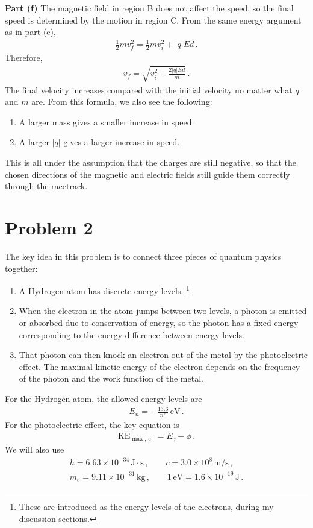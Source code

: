 \documentclass[11pt]{article}
\begin{document}
\noindent\textbf{Part (f)} The magnetic field in region B does not affect the speed, so the final speed is determined by the motion in region C. From the same energy argument as in part (e),
\begin{align*}
\frac{1}{2}mv_f^2 = \frac{1}{2}mv_i^2 + |q|Ed\,.
\end{align*}
Therefore,
\begin{align*}
v_f = \sqrt{v_i^2 + \frac{2|q|Ed}{m}}\,.
\end{align*}
The final velocity increases compared with the initial velocity no matter what $q$ and $m$ are. From this formula, we also see the following:
\begin{enumerate}
\item A larger mass gives a smaller increase in speed.
\item A larger $|q|$ gives a larger increase in speed.
\end{enumerate}
This is all under the assumption that the charges are still negative, so that the chosen directions of the magnetic and electric fields still guide them correctly through the racetrack.\\

\section*{Problem 2}
The key idea in this problem is to connect three pieces of quantum physics together:
\begin{enumerate}
\item A Hydrogen atom has discrete energy levels. \footnote{These are introduced as the energy levels of the electrons, during my discussion sections. }
\item When the electron in the atom jumps between two levels, a photon is emitted or absorbed due to conservation of energy, so the photon has a fixed energy corresponding to the energy difference between energy levels. 
\item That photon can then knock an electron out of the metal by the photoelectric effect. The maximal kinetic energy of the electron depends on the frequency of the photon and the work function of the metal. 
\end{enumerate}
For the Hydrogen atom, the allowed energy levels are
\begin{align*}
E_n = -\frac{13.6}{n^2}\,\text{eV}\,.
\end{align*}
For the photoelectric effect, the key equation is
\begin{align*}
\text{KE}_{\max,\,e^-} = E_{\gamma} - \phi\,.
\end{align*}
We will also use
\begin{align*}
h = 6.63\times 10^{-34}\,\text{J}\cdot\text{s}\,,\qquad
c = 3.0\times 10^8\,\text{m/s}\,,\\
m_e = 9.11\times 10^{-31}\,\text{kg}\,,\qquad
1\,\text{eV}=1.6\times 10^{-19}\,\text{J}\,.
\end{align*}
\end{document}
